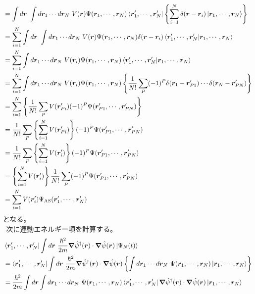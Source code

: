 \documentclass[dvipdfmx, 11pt, a4paper]{jsarticle}
\theoremstyle{definition}
\numberwithin{equation}{section}
\begin{document}
\begin{derivationBox}
\begin{align}
            &= \int d\bm{r}\ \int d\bm{r}_1\cdots d\bm{r}_N\   V(\bm{r})\Psi(\bm{r}_1,\cdots,\bm{r}_N)\bra{\bm{r}'_1,\cdots,\bm{r}'_N} \left\{  \sum_{i=1}^N\delta(\bm{r}-\bm{r}_i)\ket{\bm{r}_1,\cdots,\bm{r}_N} \right\} \notag \\
            &= \sum_{i=1}^N \int d\bm{r}\ \int d\bm{r}_1\cdots d\bm{r}_N\   V(\bm{r}) \Psi(\bm{r}_1,\cdots,\bm{r}_N) \delta(\bm{r}-\bm{r}_i) \braket{\bm{r}'_1,\cdots,\bm{r}'_N| \bm{r}_1,\cdots,\bm{r}_N} \notag \\
            &= \sum_{i=1}^N \int d\bm{r}_1\cdots d\bm{r}_N\  V(\bm{r}_i) \Psi(\bm{r}_1,\cdots,\bm{r}_N)  \braket{\bm{r}'_1,\cdots,\bm{r}'_N| \bm{r}_1,\cdots,\bm{r}_N} \notag \\
            &= \sum_{i=1}^N \int d\bm{r}_1\cdots d\bm{r}_N\   V(\bm{r}_i)\Psi(\bm{r}_1,\cdots,\bm{r}_N)  \left\{ \frac{1}{N!}\sum_P (-1)^P \delta(\bm{r}_1-\bm{r}'_{P1})\cdots\delta(\bm{r}_N-\bm{r}'_{PN})  \right\} \notag \\
            &= \sum_{i=1}^N \left\{ \frac{1}{N!} \sum_{P}V(\bm{r}'_{Pi})(-1)^P \Psi(\bm{r}'_{P1},\cdots,\bm{r}'_{PN}) \right\} \notag \\
            &= \frac{1}{N!} \sum_{P}\left\{ \sum_{i=1}^NV(\bm{r}'_{Pi})\right\} (-1)^P \Psi(\bm{r}'_{P1},\cdots,\bm{r}'_{PN})  \notag \\
            &= \frac{1}{N!} \sum_{P}\left\{ \sum_{i=1}^NV(\bm{r}'_i)\right\} (-1)^P \Psi(\bm{r}'_{P1},\cdots,\bm{r}'_{PN})  \notag \\
            &= \left\{ \sum_{i=1}^NV(\bm{r}'_i)\right\} \frac{1}{N!} \sum_{P} (-1)^P \Psi(\bm{r}'_{P1},\cdots,\bm{r}'_{PN})  \notag \\
            &= \sum_{i=1}^N V(\bm{r}'_i) \Psi_{\text{AS}}(\bm{r}'_1,\cdots,\bm{r}'_N)
        \end{align}
        となる。\\
        $\ \ $次に運動エネルギー項を計算する。
        \begin{align}
            &\bra{\bm{r}'_1,\cdots,\bm{r}'_N}\int d\bm{r}\              \frac{\hbar^2}{2m}\bm{\nabla}\hat{\psi}^\dagger(\bm{r})\cdot \bm{\nabla}\hat{\psi}(\bm{r}) \ket{\Psi_N(t)}\notag \\
            &= \bra{\bm{r}'_1,\cdots,\bm{r}'_N}\int d\bm{r}\  \frac{\hbar^2}{2m}\bm{\nabla}\hat{\psi}^\dagger(\bm{r})\cdot \bm{\nabla}\hat{\psi}(\bm{r}) \left\{ \int d\bm{r}_1\cdots d\bm{r}_N\ \Psi(\bm{r}_1,\cdots,\bm{r}_N) \ket{\bm{r}_1, \cdots ,\bm{r}_N} \right\} \notag \\
            &= \frac{\hbar^2}{2m}\int d\bm{r} \int d\bm{r}_1\cdots d\bm{r}_N\   \Psi(\bm{r}_1,\cdots,\bm{r}_N) \bra{\bm{r}'_1,\cdots,\bm{r}'_N}\bm{\nabla}\hat{\psi}^\dagger(\bm{r})\cdot\bm{\nabla}\hat{\psi}(\bm{r})\ket{\bm{r}_1, \cdots ,\bm{r}_N} 

\end{align}
\end{derivationBox}
\end{document}
